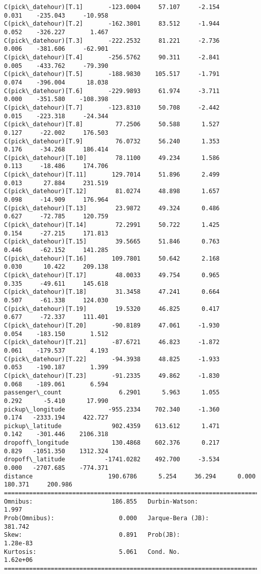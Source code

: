 \documentclass[11pt]{article}
\begin{document}
\begin{Verbatim}[commandchars=\\\{\}]
C(pick\_datehour)[T.1]       -123.0004     57.107     -2.154      0.031    -235.043     -10.958
C(pick\_datehour)[T.2]       -162.3801     83.512     -1.944      0.052    -326.227       1.467
C(pick\_datehour)[T.3]       -222.2532     81.221     -2.736      0.006    -381.606     -62.901
C(pick\_datehour)[T.4]       -256.5762     90.311     -2.841      0.005    -433.762     -79.390
C(pick\_datehour)[T.5]       -188.9830    105.517     -1.791      0.074    -396.004      18.038
C(pick\_datehour)[T.6]       -229.9893     61.974     -3.711      0.000    -351.580    -108.398
C(pick\_datehour)[T.7]       -123.8310     50.708     -2.442      0.015    -223.318     -24.344
C(pick\_datehour)[T.8]         77.2506     50.588      1.527      0.127     -22.002     176.503
C(pick\_datehour)[T.9]         76.0732     56.240      1.353      0.176     -34.268     186.414
C(pick\_datehour)[T.10]        78.1100     49.234      1.586      0.113     -18.486     174.706
C(pick\_datehour)[T.11]       129.7014     51.896      2.499      0.013      27.884     231.519
C(pick\_datehour)[T.12]        81.0274     48.898      1.657      0.098     -14.909     176.964
C(pick\_datehour)[T.13]        23.9872     49.324      0.486      0.627     -72.785     120.759
C(pick\_datehour)[T.14]        72.2991     50.722      1.425      0.154     -27.215     171.813
C(pick\_datehour)[T.15]        39.5665     51.846      0.763      0.446     -62.152     141.285
C(pick\_datehour)[T.16]       109.7801     50.642      2.168      0.030      10.422     209.138
C(pick\_datehour)[T.17]        48.0033     49.754      0.965      0.335     -49.611     145.618
C(pick\_datehour)[T.18]        31.3458     47.241      0.664      0.507     -61.338     124.030
C(pick\_datehour)[T.19]        19.5320     46.825      0.417      0.677     -72.337     111.401
C(pick\_datehour)[T.20]       -90.8189     47.061     -1.930      0.054    -183.150       1.512
C(pick\_datehour)[T.21]       -87.6721     46.823     -1.872      0.061    -179.537       4.193
C(pick\_datehour)[T.22]       -94.3938     48.825     -1.933      0.053    -190.187       1.399
C(pick\_datehour)[T.23]       -91.2335     49.862     -1.830      0.068    -189.061       6.594
passenger\_count                6.2901      5.963      1.055      0.292      -5.410      17.990
pickup\_longitude            -955.2334    702.340     -1.360      0.174   -2333.194     422.727
pickup\_latitude              902.4359    613.612      1.471      0.142    -301.446    2106.318
dropoff\_longitude            130.4868    602.376      0.217      0.829   -1051.350    1312.324
dropoff\_latitude           -1741.0282    492.700     -3.534      0.000   -2707.685    -774.371
distance                     190.6786      5.254     36.294      0.000     180.371     200.986
==============================================================================
Omnibus:                      186.855   Durbin-Watson:                   1.997
Prob(Omnibus):                  0.000   Jarque-Bera (JB):              381.742
Skew:                           0.891   Prob(JB):                     1.28e-83
Kurtosis:                       5.061   Cond. No.                     1.62e+06
==============================================================================


\end{Verbatim}
\end{document}
